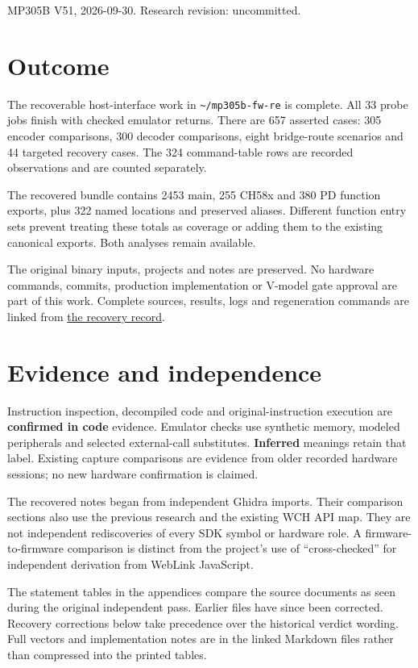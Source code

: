 MP305B V51, 2026-09-30. Research revision: uncommitted.

\section{Outcome}\label{outcome}

The recoverable host-interface work in
\texttt{\textasciitilde{}/mp305b-fw-re} is complete. All 33 probe jobs
finish with checked emulator returns. There are 657 asserted cases: 305
encoder comparisons, 300 decoder comparisons, eight bridge-route
scenarios and 44 targeted recovery cases. The 324 command-table rows are
recorded observations and are counted separately.

The recovered bundle contains 2453 main, 255 CH58x and 380 PD function
exports, plus 322 named locations and preserved aliases. Different
function entry sets prevent treating these totals as coverage or adding
them to the existing canonical exports. Both analyses remain available.

The original binary inputs, projects and notes are preserved. No
hardware commands, commits, production implementation or V-model gate
approval are part of this work. Complete sources, results, logs and
regeneration commands are linked from \href{README.md}{the recovery
record}.

\section{Evidence and independence}\label{evidence-and-independence}

Instruction inspection, decompiled code and original-instruction
execution are \textbf{confirmed in code} evidence. Emulator checks use
synthetic memory, modeled peripherals and selected external-call
substitutes. \textbf{Inferred} meanings retain that label. Existing
capture comparisons are evidence from older recorded hardware sessions;
no new hardware confirmation is claimed.

The recovered notes began from independent Ghidra imports. Their
comparison sections also use the previous research and the existing WCH
API map. They are not independent rediscoveries of every SDK symbol or
hardware role. A firmware-to-firmware comparison is distinct from the
project's use of ``cross-checked'' for independent derivation from
WebLink JavaScript.

The statement tables in the appendices compare the source documents as
seen during the original independent pass. Earlier files have since been
corrected. Recovery corrections below take precedence over the
historical verdict wording. Full vectors and implementation notes are in
the linked Markdown files rather than compressed into the printed
tables.

